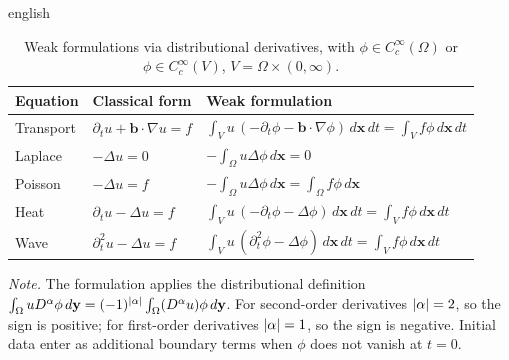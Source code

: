 \documentclass[0000.tex]{subfiles}
\begin{document}
\begin{hyphenrules}{english}
\begin{table}[htbp]
  \centering
  \caption[Weak formulations via distributional derivatives]{Weak formulations via distributional derivatives, with
  $\phi\in C_c^\infty(\Omega)$ or $\phi\in C_c^\infty(V)$, $V=\Omega\times(0,\infty)$.}
  \label{tab:weak-forms}
  \small
  \begin{tabular}{@{}lll@{}}
    \toprule
    Equation & Classical form & Weak formulation \\
    \midrule
    Transport & $\partial_t u+\mathbf{b}\cdot\nabla u=f$ & $\displaystyle\int_V u\,(-\partial_t\phi-\mathbf{b}\cdot\nabla\phi)\,d\mathbf{x}\,d t=\int_V f\phi\,d\mathbf{x}\,d t$ \\[3mm]
    Laplace   & $-\Delta u=0$ & $\displaystyle-\int_\Omega u\Delta\phi\,d\mathbf{x}=0$ \\[3mm]
    Poisson   & $-\Delta u=f$ & $\displaystyle-\int_\Omega u\Delta\phi\,d\mathbf{x}=\int_\Omega f\phi\,d\mathbf{x}$ \\[3mm]
    Heat      & $\partial_t u-\Delta u=f$ & $\displaystyle\int_V u\,(-\partial_t\phi-\Delta\phi)\,d\mathbf{x}\,d t=\int_V f\phi\,d\mathbf{x}\,d t$ \\[3mm]
    Wave      & $\partial_t^2u-\Delta u=f$ & $\displaystyle\int_V u\,(\partial_t^2\phi-\Delta\phi)\,d\mathbf{x}\,d t=\int_V f\phi\,d\mathbf{x}\,d t$ \\
    \bottomrule
  \end{tabular}
  \par\smallskip
  \parbox{0.92\linewidth}{\footnotesize\emph{Note.} The formulation applies the distributional definition
  $\int_\Omega uD^\alpha\phi\,d\mathbf{y}=(-1)^{\left\lvert \alpha \right\rvert}\int_\Omega(D^\alpha u)\phi\,d\mathbf{y}$. For second-order
  derivatives $\left\lvert \alpha \right\rvert=2$, so the sign is positive; for first-order derivatives $\left\lvert \alpha \right\rvert=1$, so
  the sign is negative. Initial data enter as additional boundary terms when $\phi$ does not vanish at
  $t=0$.}
\end{table}


\end{hyphenrules}
\end{document}
